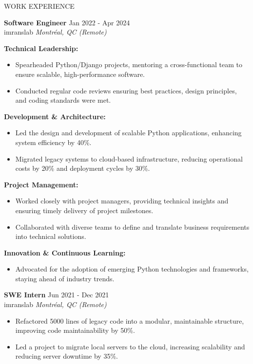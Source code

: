\documentclass{resume} %
\begin{document}

\begin{rSection}{WORK EXPERIENCE}

\textbf{Software Engineer} \hfill Jan 2022 - Apr 2024\\
imranslab \hfill \textit{Montréal, QC (Remote)}

\textbf{Technical Leadership:}
 \begin{itemize}
    \item Spearheaded Python/Django projects, mentoring a cross-functional team to ensure scalable, high-performance software.
    \item Conducted regular code reviews ensuring best practices, design principles, and coding standards were met.
 \end{itemize}

\textbf{Development \& Architecture:}
 \begin{itemize}
    \item Led the design and development of scalable Python applications, enhancing system efficiency by 40\%.
    \item Migrated legacy systems to cloud-based infrastructure, reducing operational costs by 20\% and deployment cycles by 30\%.
 \end{itemize}

\textbf{Project Management:}
 \begin{itemize}
    \item Worked closely with project managers, providing technical insights and ensuring timely delivery of project milestones.
    \item Collaborated with diverse teams to define and translate business requirements into technical solutions.
 \end{itemize}

\textbf{Innovation \& Continuous Learning:}
 \begin{itemize}
    \item Advocated for the adoption of emerging Python technologies and frameworks, staying ahead of industry trends.
 \end{itemize}

\textbf{SWE Intern} \hfill Jun 2021 - Dec 2021\\
imranslab \hfill \textit{Montréal, QC (Remote)}

\begin{itemize}
    \item Refactored 5000 lines of legacy code into a modular, maintainable structure, improving code maintainability by 50\%.
    \item Led a project to migrate local servers to the cloud, increasing scalability and reducing server downtime by 35\%.
\end{itemize}

\end{rSection} 
\end{document}
